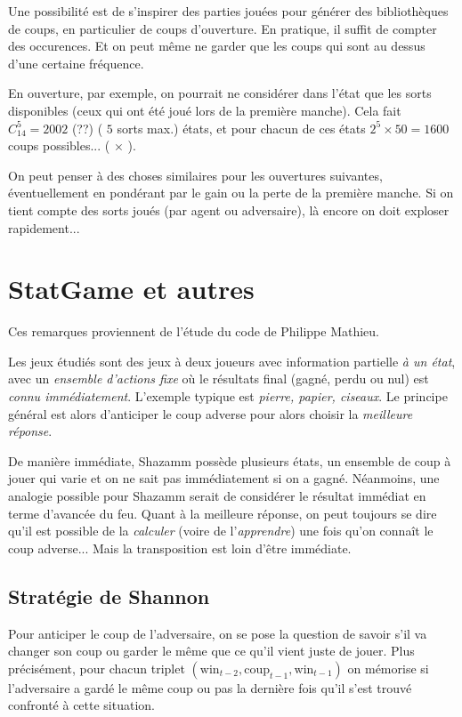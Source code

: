 Une possibilité est de s'inspirer des parties jouées pour générer des bibliothèques de coups, en particulier de coups d'ouverture. En pratique, il suffit de compter des occurences. Et on peut même ne garder que les coups qui sont au dessus d'une certaine fréquence.

En ouverture, par exemple, on pourrait ne considérer dans l'état que les sorts disponibles (ceux qui ont été joué lors de la première manche). Cela fait $C_{14}^{5}=2002$ (??) ( $5$ sorts max.) états, et pour chacun de ces états $2^5 \times 50 = 1600$ coups possibles... ( \sorts $\times$ \mana).

On peut penser à des choses similaires pour les ouvertures suivantes, éventuellement en pondérant par le gain ou la perte de la première manche. Si on tient compte des sorts joués (par agent ou adversaire), là encore on doit exploser rapidement...

\section{StatGame et autres}
\label{sec:statgame}

Ces remarques proviennent de l'étude du code de Philippe Mathieu.

Les jeux étudiés sont des jeux à deux joueurs avec information partielle {\em à un état}, avec un {\em ensemble d'actions fixe} où le résultats final (gagné, perdu ou nul) est {\em connu immédiatement}. L'exemple typique est {\em pierre, papier, ciseaux}. Le principe général est alors d'anticiper le coup adverse pour alors choisir la {\em meilleure réponse}. 

De manière immédiate, Shazamm possède plusieurs états, un ensemble de coup à jouer qui varie et on ne sait pas immédiatement si on a gagné. Néanmoins, une analogie possible pour Shazamm serait de considérer le résultat immédiat en terme d'avancée du feu. Quant à la meilleure réponse, on peut toujours se dire qu'il est possible de la {\em calculer} (voire de l'{\em apprendre}) une fois qu'on connaît le coup adverse... Mais la transposition est loin d'être immédiate. 

\subsection{Stratégie de Shannon}
\label{sec:statgame:shannon}

Pour anticiper le coup de l'adversaire, on se pose la question de savoir s'il va changer son coup ou garder le même que ce qu'il vient juste de jouer. Plus précisément, pour chacun triplet $( \mathrm{win}_{t-2}, \mathrm{coup}_{t-1}, \mathrm{win}_{t-1})$ on mémorise si l'adversaire a gardé le même coup ou pas la dernière fois qu'il s'est trouvé confronté à cette situation.

